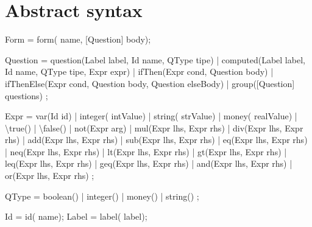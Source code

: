 \documentclass[a4paper]{article}
\def\mysect#1{\vspace*{-20pt}\section*{\textsf{#1}}\vspace*{-10pt}}
\begin{document}
\mysect{Abstract syntax}
\begin{rascal}
 Form
  = form( name, [Question] body);
  
 Question
  = question(Label label, Id name, QType tipe)
  | computed(Label label, Id name, QType tipe, Expr expr)
  | ifThen(Expr cond, Question body)
  | ifThenElse(Expr cond, Question body, Question elseBody)
  | group([Question] questions)
  ;

 Expr
  = var(Id id)
  | integer( intValue)
  | string( strValue)
  | money( realValue)
  | \textbackslash{}true()
  | \textbackslash{}false()
  | not(Expr arg)
  | mul(Expr lhs, Expr rhs)
  | div(Expr lhs, Expr rhs)
  | add(Expr lhs, Expr rhs)
  | sub(Expr lhs, Expr rhs)
  | eq(Expr lhs, Expr rhs)
  | neq(Expr lhs, Expr rhs)
  | lt(Expr lhs, Expr rhs)
  | gt(Expr lhs, Expr rhs)
  | leq(Expr lhs, Expr rhs)
  | geq(Expr lhs, Expr rhs)
  | and(Expr lhs, Expr rhs)
  | or(Expr lhs, Expr rhs)
  ;
  
 
 QType
 = boolean()
 | integer()
 | money()
 | string()
 ; 
 
 Id = id( name);
 Label = label( label); 

\end{rascal}
\end{document}
